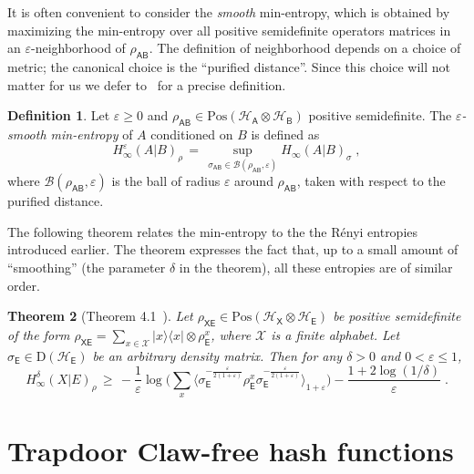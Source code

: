 \documentclass[11pt]{article}
\newtheorem{theorem}{Theorem}
\theoremstyle{remark}
\theoremstyle{definition}
\newtheorem{definition}[theorem]{Definition}
\newcommand{\ket}[1]{|#1\rangle}
\newcommand{\bra}[1]{\langle#1|}
\newcommand{\proj}[1]{\ket{#1}\!\bra{#1}}
\newcommand{\reg}[1]{{\textsf{#1}}}
\newcommand{\mX}{\ensuremath{\mathcal{X}}}
\newcommand{\mH}{\mathcal{H}}
\newcommand{\setft}[1]{\mathrm{#1}}
\newcommand{\Density}{\setft{D}}
\newcommand{\Pos}{\setft{Pos}}
\newcommand{\eps}{\varepsilon}
\newcommand{\Hmin}{H_\infty}
\begin{document}
It is often convenient to consider the \emph{smooth} min-entropy, which is obtained by maximizing the min-entropy over all positive semidefinite operators matrices in an $\eps$-neighborhood of $\rho_\reg{AB}$. The definition of neighborhood depends on a choice of metric; the canonical choice is the ``purified distance''. Since this choice will not matter for us we defer to~\cite{tomamichel2015quantum} for a precise definition.

\begin{definition}\label{prelim:def:smooth-min-entropy}
  Let $\eps \geq 0$ and $\rho_\reg{AB}\in\Pos(\mH_\reg{A}\otimes\mH_\reg{B})$ positive semidefinite. The
  \emph{$\eps$-smooth min-entropy} of $A$ conditioned on $B$ is defined as
  \begin{equation*}
    \Hmin^\eps(A|B)_\rho \,=\, \sup_{\sigma_\reg{AB} \in \mathcal{B}(
      \rho_\reg{AB},\eps) } \Hmin(A|B)_\sigma\;,
  \end{equation*}
	where $\mathcal{B}(
      \rho_\reg{AB},\eps) $ is the ball of radius $\eps$ around $\rho_\reg{AB}$, taken with respect to the purified distance.
\end{definition}

The following theorem relates the min-entropy to the the R\'enyi entropies introduced earlier. The theorem expresses the fact that, up to a small amount of ``smoothing'' (the parameter $\delta$ in the theorem), all these entropies are of similar order. 

\begin{theorem}[Theorem 4.1~\cite{miller2014universal}]\label{thm:ms}
Let $ \rho_{\reg{XE}}\in\Pos(\mH_\reg{X}\otimes \mH_\reg{E}) $ be positive semidefinite of the form $\rho_{\reg{XE}} = \sum_{x\in\mX} \proj{x} \otimes \rho^x_{\reg{E}}$, where $\mX$ is a finite alphabet. Let $\sigma_{\reg{E}}\in\Density(\mH_\reg{E})$ be an arbitrary density matrix. Then for any $\delta >0$ and $0<\eps\leq 1$,
$$ \Hmin^\delta(X|E)_\rho \,\geq\, -\frac{1}{\eps} \log \Big( \sum_x \langle \sigma_{\reg{E}}^{-\frac{\eps}{2(1+\eps)}}\rho_{\reg{E}}^x \sigma_{\reg{E}}^{-\frac{\eps}{2(1+\eps)}} \rangle_{1+\eps} \Big) - \frac{1+2\log(1/\delta)}{\eps}\;.$$
\end{theorem}


\section{Trapdoor Claw-free hash functions}
\label{sec:tcf}
\end{document}
